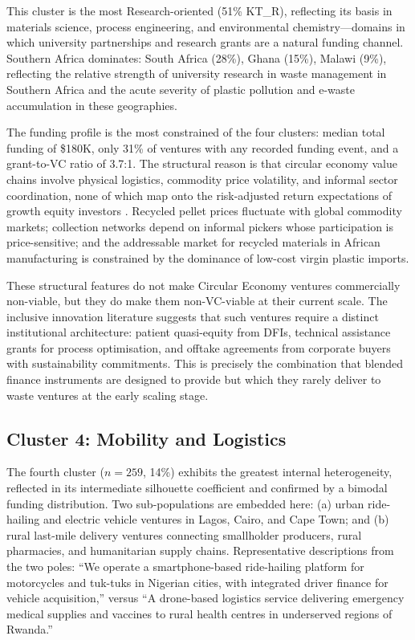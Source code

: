 \documentclass[review,12pt]{elsarticle}
\begin{document}
This cluster is the most Research-oriented (51\% KT\_R), reflecting
its basis in materials science, process engineering, and environmental
chemistry---domains in which university partnerships and research
grants are a natural funding channel. Southern Africa dominates:
South Africa (28\%), Ghana (15\%), Malawi (9\%), reflecting the
relative strength of university research in waste management in
Southern Africa and the acute severity of plastic pollution and e-waste
accumulation in these geographies.

The funding profile is the most constrained of the four clusters:
median total funding of \$180K, only 31\% of ventures with any
recorded funding event, and a grant-to-VC ratio of 3.7:1. The
structural reason is that circular economy value chains involve
physical logistics, commodity price volatility, and informal sector
coordination, none of which map onto the risk-adjusted return
expectations of growth equity investors \citep{reimsbach2022blended}.
Recycled pellet prices fluctuate with global commodity markets;
collection networks depend on informal pickers whose participation is
price-sensitive; and the addressable market for recycled materials in
African manufacturing is constrained by the dominance of low-cost
virgin plastic imports.

These structural features do not make Circular Economy ventures
commercially non-viable, but they do make them non-VC-viable at
their current scale. The inclusive innovation literature
\citep{onsongo2019frugal} suggests that such ventures require a
distinct institutional architecture: patient quasi-equity from DFIs,
technical assistance grants for process optimisation, and offtake
agreements from corporate buyers with sustainability commitments.
This is precisely the combination that blended finance instruments
are designed to provide but which they rarely deliver to waste
ventures at the early scaling stage.

\subsection{Cluster 4: Mobility and Logistics}
\label{ssec:c4}

The fourth cluster ($n = 259$, 14\%) exhibits the greatest internal
heterogeneity, reflected in its intermediate silhouette coefficient
and confirmed by a bimodal funding distribution. Two sub-populations
are embedded here: (a) urban ride-hailing and electric vehicle
ventures in Lagos, Cairo, and Cape Town; and (b) rural last-mile
delivery ventures connecting smallholder producers, rural pharmacies,
and humanitarian supply chains. Representative descriptions from the
two poles: ``We operate a smartphone-based ride-hailing platform for
motorcycles and tuk-tuks in Nigerian cities, with integrated driver
finance for vehicle acquisition,'' versus ``A drone-based logistics
service delivering emergency medical supplies and vaccines to rural
health centres in underserved regions of Rwanda.''
\end{document}
